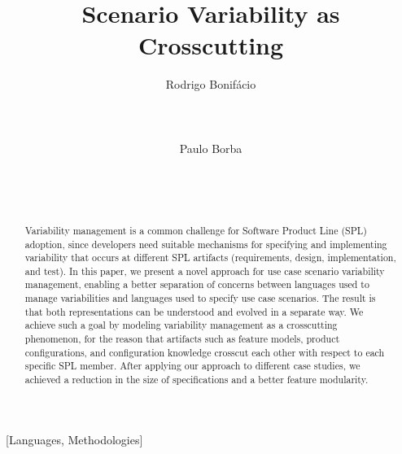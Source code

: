 \documentclass{acm_proc_article-sp}
\begin{document}
\lstset{language=Haskell, numbers=left,
numberstyle=\tiny,numbersep=5pt,basicstyle=\scriptsize,aboveskip=20pt}

\title{Scenario Variability as Crosscutting}



\author{
\alignauthor
Rodrigo Bonif\'{a}cio\\
       \\
       \\
       \\
\alignauthor
Paulo Borba\\
       \\
       \\
       \\
}

\maketitle

\begin{abstract}
Variability management is a common challenge for Software Product
Line (SPL) adoption, since developers need suitable
mechanisms for specifying and implementing variability
that occurs at different SPL artifacts (requirements, design,
implementation, and test). In this paper, we present a novel approach for
use case scenario variability management, enabling a better
separation of concerns between languages used to manage
variabilities and languages used to specify use case scenarios. The
result is that both representations can be understood and evolved in
a separate way. We achieve such a goal by modeling variability management
as a crosscutting phenomenon, for the reason that artifacts such as feature models,
product configurations, and configuration knowledge crosscut each
other with respect to each specific SPL member. After applying our approach to
different case studies, we achieved a reduction in the size of specifications
and a better feature modularity.
\end{abstract}

[Languages,
Methodologies]\

\end{document}

